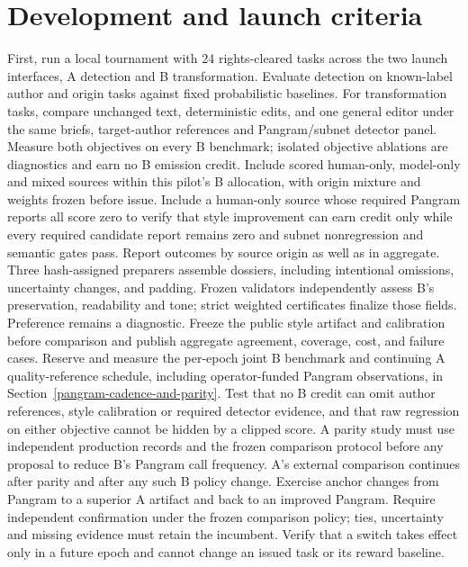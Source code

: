 \section{Development and launch
criteria}\label{development-and-launch-criteria}

First, run a local tournament with 24 rights-cleared tasks across the
two launch interfaces, A detection and B transformation. Evaluate
detection on known-label author and origin tasks against fixed
probabilistic baselines. For transformation tasks, compare
unchanged text, deterministic edits, and one general editor under the
same briefs, target-author references and Pangram/subnet detector panel.
Measure both objectives on every B benchmark; isolated objective
ablations are diagnostics and earn no B emission credit.
Include scored human-only, model-only and mixed sources within this
pilot's B allocation, with origin mixture and weights frozen before issue.
Include a human-only source whose required Pangram reports all score zero
to verify that style improvement can earn credit only while every required
candidate report remains zero and subnet nonregression and semantic
gates pass. Report outcomes by source origin as well as in aggregate.
Three hash-assigned preparers assemble dossiers, including
intentional omissions, uncertainty changes, and padding. Frozen
validators independently assess B's preservation, readability and tone;
strict weighted certificates finalize those fields. Preference remains
a diagnostic. Freeze the public style artifact and calibration before
comparison and publish aggregate agreement, coverage, cost, and failure
cases.
Reserve and measure the per-epoch joint B benchmark and continuing A
quality-reference schedule, including operator-funded Pangram observations,
in Section~\ref{pangram-cadence-and-parity}. Test that no B credit
can omit author references, style calibration or required detector
evidence, and that raw regression on either objective cannot be hidden
by a clipped score. A parity study must use independent production
records and the frozen comparison protocol before any proposal to
reduce B's Pangram call frequency. A's external comparison continues
after parity and after any such B policy change.
Exercise anchor changes from Pangram to a superior A artifact and back
to an improved Pangram. Require independent confirmation under the
frozen comparison policy; ties, uncertainty and missing evidence must
retain the incumbent. Verify that a switch takes effect only in a
future epoch and cannot change an issued task or its reward baseline.

